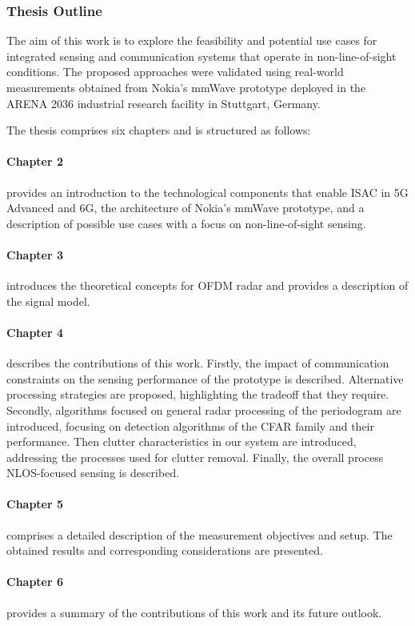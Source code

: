 \subsubsection{Thesis Outline}

The aim of this work is to explore the feasibility and potential use cases for integrated sensing and communication systems that operate in non-line-of-sight conditions.
The proposed approaches were validated using real-world measurements obtained from Nokia's mmWave prototype deployed in the ARENA 2036 industrial research facility in Stuttgart, Germany.

The thesis comprises six chapters and is structured as follows:

\paragraph{Chapter 2} provides an introduction to the technological components that enable ISAC in 5G Advanced and 6G, the architecture of Nokia's mmWave prototype, and a description of possible use cases with a focus on non-line-of-sight sensing.

\paragraph{Chapter 3} introduces the theoretical concepts for OFDM radar and provides a description of the signal model.

\paragraph{Chapter 4} describes the contributions of this work. Firstly, the impact of communication constraints on the sensing performance of the prototype is described. Alternative processing strategies are proposed, highlighting the tradeoff that they require.
Secondly, algorithms focused on general radar processing of the periodogram are introduced, focusing on detection algorithms of the CFAR family and their performance.
Then clutter characteristics in our system are introduced, addressing the processes used for clutter removal.
Finally, the overall process NLOS-focused sensing is described.

\paragraph{Chapter 5} comprises a detailed description of the measurement objectives and setup. The obtained results and corresponding considerations are presented.

\paragraph{Chapter 6} provides a summary of the contributions of this work and its future outlook.

